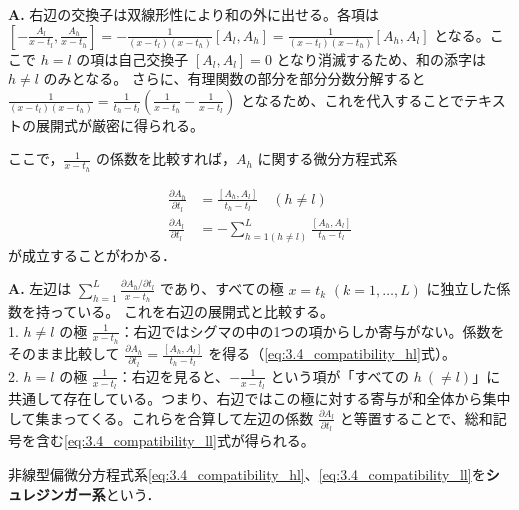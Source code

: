 \begin{Q}
\textbf{A.} 右辺の交換子は双線形性により和の外に出せる。各項は
$\left[ -\frac{A_l}{x-t_l}, \frac{A_h}{x-t_h} \right] = -\frac{1}{(x-t_l)(x-t_h)} [A_l, A_h] = \frac{1}{(x-t_l)(x-t_h)} [A_h, A_l]$ 
となる。ここで $h=l$ の項は自己交換子 $[A_l, A_l] = 0$ となり消滅するため、和の添字は $h \neq l$ のみとなる。
さらに、有理関数の部分を部分分数分解すると
$\frac{1}{(x-t_l)(x-t_h)} = \frac{1}{t_h - t_l} \left( \frac{1}{x-t_h} - \frac{1}{x-t_l} \right)$ 
となるため、これを代入することでテキストの展開式が厳密に得られる。
\end{Q}

ここで，$\frac{1}{x-t_h}$ の係数を比較すれば，$A_h$ に関する微分方程式系

\begin{align}
  \frac{\partial A_h}{\partial t_l} &= \frac{[A_h, A_l]}{t_h - t_l} \quad (h \neq l)\label{eq:3.4_compatibility_hl} \\
  \frac{\partial A_l}{\partial t_l} &= - \sum_{h=1(h \neq l)}^L \frac{[A_h, A_l]}{t_h - t_l}\label{eq:3.4_compatibility_ll}
\end{align}
が成立することがわかる．

\begin{Q}[左辺と右辺の係数比較から、なぜ $h \neq l$ の場合\eqref{eq:eq:3.4_compatibility_hl}と $h=l$ の場合\eqref{eq:3.4_compatibility_ll}の2つの異なる方程式が抽出されるのか？]
\textbf{A.} 左辺は $\sum_{h=1}^L \frac{\partial A_h / \partial t_l}{x-t_h}$ であり、すべての極 $x=t_k$ $(k=1,\dots,L)$ に独立した係数を持っている。
これを右辺の展開式と比較する。\\
1. $h \neq l$ の極 $\frac{1}{x-t_h}$：右辺ではシグマの中の1つの項からしか寄与がない。係数をそのまま比較して $\frac{\partial A_h}{\partial t_l} = \frac{[A_h, A_l]}{t_h - t_l}$ を得る（\eqref{eq:3.4_compatibility_hl}式）。\\
2. $h = l$ の極 $\frac{1}{x-t_l}$：右辺を見ると、$-\frac{1}{x-t_l}$ という項が「すべての $h \ (\neq l)$」に共通して存在している。つまり、右辺ではこの極に対する寄与が和全体から集中して集まってくる。これらを合算して左辺の係数 $\frac{\partial A_l}{\partial t_l}$ と等置することで、総和記号を含む\eqref{eq:3.4_compatibility_ll}式が得られる。
\end{Q}

\begin{definition}
非線型偏微分方程式系\eqref{eq:3.4_compatibility_hl}、\eqref{eq:3.4_compatibility_ll}を\textbf{シュレジンガー系}という．
\end{definition}


